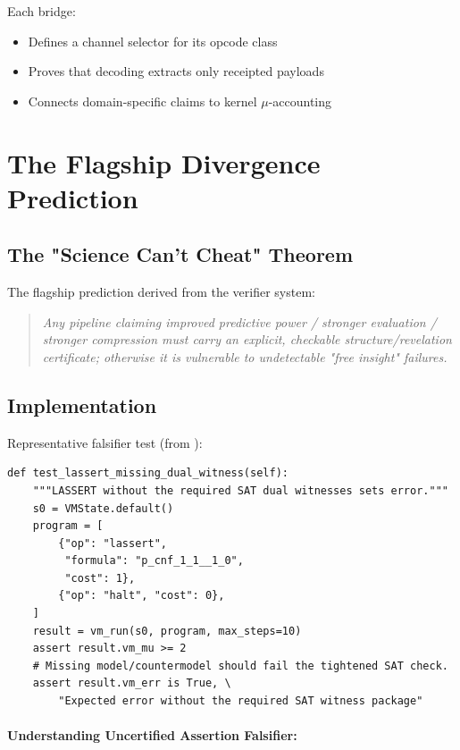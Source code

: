 Each bridge:
\begin{itemize}
    \item Defines a channel selector for its opcode class
    \item Proves that decoding extracts only receipted payloads
    \item Connects domain-specific claims to kernel $\mu$-accounting
\end{itemize}

\section{The Flagship Divergence Prediction}

\subsection{The "Science Can't Cheat" Theorem}

The flagship prediction derived from the verifier system:

\begin{quote}
\textit{Any pipeline claiming improved predictive power / stronger evaluation / stronger compression must carry an explicit, checkable structure/revelation certificate; otherwise it is vulnerable to undetectable "free insight" failures.}
\end{quote}

\subsection{Implementation}

Representative falsifier test (from ):
\begin{lstlisting}
def test_lassert_missing_dual_witness(self):
    """LASSERT without the required SAT dual witnesses sets error."""
    s0 = VMState.default()
    program = [
        {"op": "lassert",
         "formula": "p_cnf_1_1__1_0",
         "cost": 1},
        {"op": "halt", "cost": 0},
    ]
    result = vm_run(s0, program, max_steps=10)
    assert result.vm_mu >= 2
    # Missing model/countermodel should fail the tightened SAT check.
    assert result.vm_err is True, \
        "Expected error without the required SAT witness package"
\end{lstlisting}

\paragraph{Understanding Uncertified Assertion Falsifier:}

